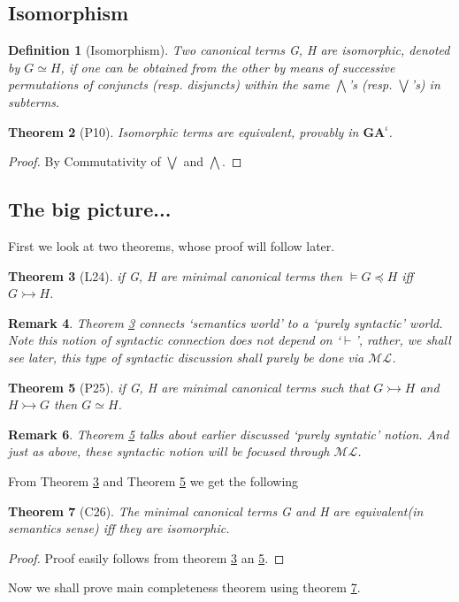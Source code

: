 \documentclass[10pt]{article}
\newcommand{\ml}{\mathcal{ML}}
\newcommand{\id}{\iota}
\newcommand{\cle}{\preccurlyeq}
\newtheorem{theorem}{Theorem}
\newtheorem{definition}[theorem]{Definition}
\newtheorem{remark}[theorem]{Remark}
\begin{document}
		\subsection{Isomorphism}
		\begin{definition}[Isomorphism]
			Two canonical terms G, H are isomorphic, denoted by $G \simeq H$, if one can be obtained from the other by means of successive permutations
			of conjuncts (resp. disjuncts) within the same $\bigwedge$’s (resp. $\bigvee$’s) in subterms.
		\end{definition}
		\begin{theorem}[P10]\label{th15}
		Isomorphic terms are equivalent, provably in $\textbf{GA}^\id$.
		\end{theorem}
		\begin{proof}
			By Commutativity of $\bigvee$ and $\bigwedge$.
		\end{proof}
		
		\subsection{The big picture...}
		First we look at two theorems, whose proof will follow later.
		\begin{theorem}[L24]\label{th16}
			if G, H are  minimal canonical terms then $\models G\cle H$ iff $G \rightarrowtail H$.
		\end{theorem}
		\begin{remark}
			Theorem \ref{th16} connects `semantics world' to a `purely syntactic' world. Note this notion of syntactic connection does not depend on `$\vdash$', rather, we shall see later, this type of syntactic discussion shall purely be done via $\ml$.
		\end{remark}
		\begin{theorem}[P25]\label{th17}
			if G, H are minimal canonical terms such that $G\rightarrowtail H$ and $H \rightarrowtail G$ then $G\simeq H$.
		\end{theorem}
		\begin{remark}
			Theorem \ref{th17} talks about earlier discussed `purely syntatic' notion. And just as above, these syntactic notion  will be focused through $\ml$.
		\end{remark}
		From Theorem \ref{th16} and Theorem \ref{th17} we get the following 
		\begin{theorem}[C26]\label{th18}
			The minimal canonical terms G and H are equivalent(in semantics sense) iﬀ
			they are isomorphic.
		\end{theorem}
		\begin{proof}
			Proof easily follows from theorem \ref{th16} an \ref{th17}.
		\end{proof}
		Now we shall prove main completeness theorem using theorem \ref{th18}.
		
\end{document}

